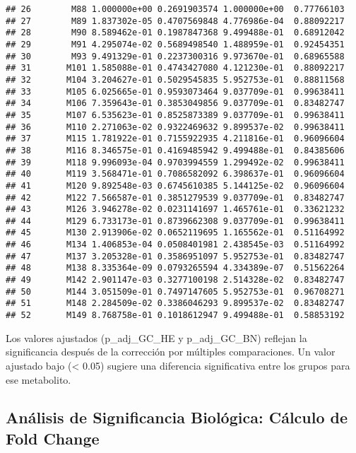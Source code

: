 \documentclass[
]{article}
\begin{document}
\begin{verbatim}
## 26        M88 1.000000e+00 0.2691903574 1.000000e+00  0.77766103
## 27        M89 1.837302e-05 0.4707569848 4.776986e-04  0.88092217
## 28        M90 8.589462e-01 0.1987847368 9.499488e-01  0.68912042
## 29        M91 4.295074e-02 0.5689498540 1.488959e-01  0.92454351
## 30        M93 9.491329e-01 0.2237300316 9.973670e-01  0.68965588
## 31       M101 1.585088e-01 0.4743427080 4.121230e-01  0.88092217
## 32       M104 3.204627e-01 0.5029545835 5.952753e-01  0.88811568
## 33       M105 6.025665e-01 0.9593073464 9.037709e-01  0.99638411
## 34       M106 7.359643e-01 0.3853049856 9.037709e-01  0.83482747
## 35       M107 6.535623e-01 0.8525873389 9.037709e-01  0.99638411
## 36       M110 2.271063e-02 0.9322469632 9.899537e-02  0.99638411
## 37       M115 1.781922e-01 0.7155922935 4.211816e-01  0.96096604
## 38       M116 8.346575e-01 0.4169485942 9.499488e-01  0.84385606
## 39       M118 9.996093e-04 0.9703994559 1.299492e-02  0.99638411
## 40       M119 3.568471e-01 0.7086582092 6.398637e-01  0.96096604
## 41       M120 9.892548e-03 0.6745610385 5.144125e-02  0.96096604
## 42       M122 7.566587e-01 0.3851279539 9.037709e-01  0.83482747
## 43       M126 3.946278e-02 0.0231141697 1.465761e-01  0.33621232
## 44       M129 6.733173e-01 0.8739662308 9.037709e-01  0.99638411
## 45       M130 2.913906e-02 0.0652119695 1.165562e-01  0.51164992
## 46       M134 1.406853e-04 0.0508401981 2.438545e-03  0.51164992
## 47       M137 3.205328e-01 0.3586951097 5.952753e-01  0.83482747
## 48       M138 8.335364e-09 0.0793265594 4.334389e-07  0.51562264
## 49       M142 2.901147e-03 0.3277100198 2.514328e-02  0.83482747
## 50       M144 3.051509e-01 0.7497147605 5.952753e-01  0.96708271
## 51       M148 2.284509e-02 0.3386046293 9.899537e-02  0.83482747
## 52       M149 8.768758e-01 0.1018612947 9.499488e-01  0.58853192
\end{verbatim}

Los valores ajustados (p\_adj\_GC\_HE y p\_adj\_GC\_BN) reflejan la
significancia después de la corrección por múltiples comparaciones. Un
valor ajustado bajo (\textless{} 0.05) sugiere una diferencia
significativa entre los grupos para ese metabolito.

\subsection{Análisis de Significancia Biológica: Cálculo de Fold
Change}\label{anuxe1lisis-de-significancia-bioluxf3gica-cuxe1lculo-de-fold-change}
\end{document}
